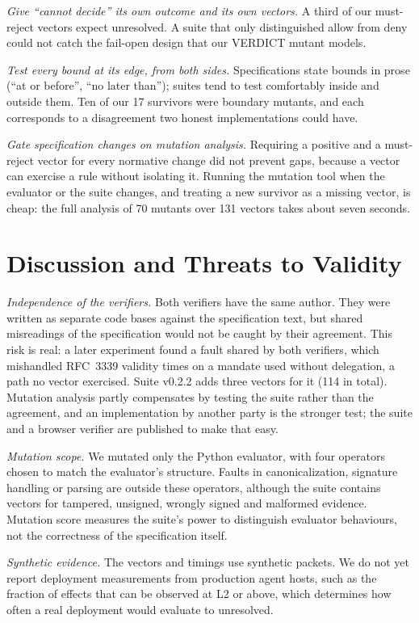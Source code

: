 \documentclass[conference]{IEEEtran}
\newcommand{\unres}{\textsf{unresolved}}
\begin{document}
\emph{Give ``cannot decide'' its own outcome and its own vectors.} A third of our must-reject vectors expect \unres{}. A suite that only distinguished allow from deny could not catch the fail-open design that our VERDICT mutant models.

\emph{Test every bound at its edge, from both sides.} Specifications state bounds in prose (``at or before'', ``no later than''); suites tend to test comfortably inside and outside them. Ten of our 17 survivors were boundary mutants, and each corresponds to a disagreement two honest implementations could have.

\emph{Gate specification changes on mutation analysis.} Requiring a positive and a must-reject vector for every normative change did not prevent gaps, because a vector can exercise a rule without isolating it. Running the mutation tool when the evaluator or the suite changes, and treating a new survivor as a missing vector, is cheap: the full analysis of 70 mutants over 131 vectors takes about seven seconds.

\section{Discussion and Threats to Validity}\label{sec:threats}

\emph{Independence of the verifiers.} Both verifiers have the same author. They were written as separate code bases against the specification text, but shared misreadings of the specification would not be caught by their agreement. This risk is real: a later experiment found a fault shared by both verifiers, which mishandled RFC~3339 validity times on a mandate used without delegation, a path no vector exercised. Suite v0.2.2 adds three vectors for it (114 in total). Mutation analysis partly compensates by testing the suite rather than the agreement, and an implementation by another party is the stronger test; the suite and a browser verifier are published to make that easy.

\emph{Mutation scope.} We mutated only the Python evaluator, with four operators chosen to match the evaluator's structure. Faults in canonicalization, signature handling or parsing are outside these operators, although the suite contains vectors for tampered, unsigned, wrongly signed and malformed evidence. Mutation score measures the suite's power to distinguish evaluator behaviours, not the correctness of the specification itself.

\emph{Synthetic evidence.} The vectors and timings use synthetic packets. We do not yet report deployment measurements from production agent hosts, such as the fraction of effects that can be observed at L2 or above, which determines how often a real deployment would evaluate to \unres{}.
\end{document}
